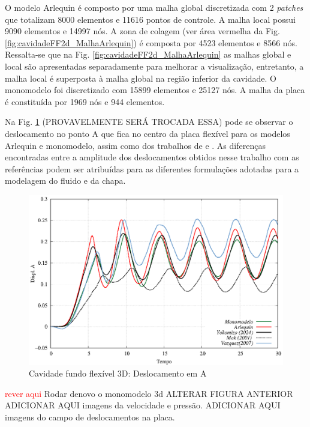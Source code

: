 \documentclass[tese_patricia]{subfiles}
\begin{document}
O modelo Arlequin é composto por uma malha global discretizada com 2 \textit{patches} que totalizam 8000 elementos e 11616 pontos de controle. A malha local possui 9090 elementos e 14997 nós. A zona de colagem (ver área vermelha da Fig. \ref {fig:cavidadeFF2d_MalhaArlequin}) é composta por 4523 elementos e 8566 nós. Ressalta-se que na Fig. \ref {fig:cavidadeFF2d_MalhaArlequin} as malhas global e local são apresentadas separadamente para melhorar a visualização, entretanto, a malha local é superposta à malha global na região inferior da cavidade.  O monomodelo foi discretizado com 15899 elementos e 25127 nós. A malha da placa é constituída por 1969 nós e 944 elementos.

Na Fig. \ref{fig:cavidadeFF2d_DeslocamentoemA} (PROVAVELMENTE SERÁ TROCADA ESSA) pode se observar o deslocamento no ponto A que fica no centro da placa flexível para os modelos Arlequin e monomodelo, assim como dos trabalhos de  e . As diferenças encontradas entre a amplitude dos deslocamentos obtidos nesse trabalho com as referências podem ser atribuídas para as diferentes formulações adotadas para a modelagem do fluido e da chapa.

\begin{figure}[htb!]
	\centering 
	\includegraphics[scale=1.0,trim=0cm 0cm 0cm 0cm, clip=true]{Imagens/Cap7/Cav3dDisplacement.eps}	
	\caption{Cavidade fundo flexível 3D: Deslocamento em A}
	\label{fig:cavidadeFF2d_DeslocamentoemA}
\end{figure}

\textcolor{red}{rever aqui}
Rodar denovo o monomodelo 3d
ALTERAR FIGURA ANTERIOR
ADICIONAR AQUI imagens da velocidade e pressão.
ADICIONAR AQUI imagens do campo de deslocamentos na placa.
\end{document}
